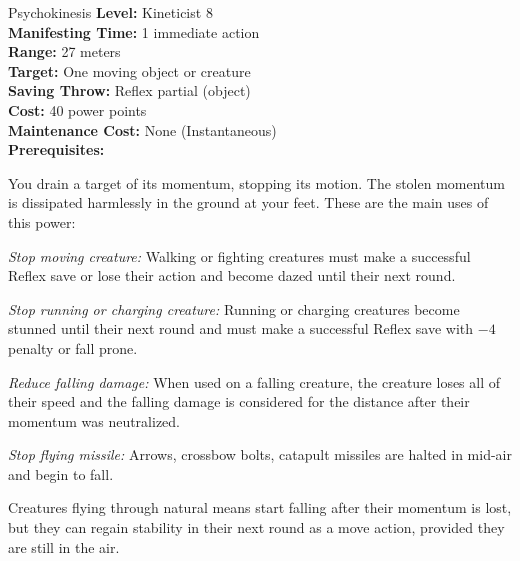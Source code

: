 {Psychokinesis}
{
	\textbf{Level:}
	Kineticist 8\\
	\textbf{Manifesting Time:}
	1 immediate action\\
	\textbf{Range:}
	27 meters\\
	\textbf{Target:}
	One moving object or creature\\
	\textbf{Saving Throw:}
	Reflex partial (object)\\
	\textbf{Cost:}
	40 power points\\
	\textbf{Maintenance Cost:}
	None (Instantaneous)\\
	\textbf{Prerequisites:}
	\\
}
{
	You drain a target of its momentum, stopping its motion. The stolen momentum is dissipated harmlessly in the ground at your feet. These are the main uses of this power:
	\begin{enumerate*}
		\item \textit{Stop moving creature:} Walking or fighting creatures must make a successful Reflex save or lose their action and become dazed until their next round.

		\item \textit{Stop running or charging creature:} Running or charging creatures become stunned until their next round and must make a successful Reflex save with $-4$ penalty or fall prone.

		\item \textit{Reduce falling damage:} When used on a falling creature, the creature loses all of their speed and the falling damage is considered for the distance after their momentum was neutralized.

		\item \textit{Stop flying missile:} Arrows, crossbow bolts, catapult missiles are halted in mid-air and begin to fall.
	\end{enumerate*}

	Creatures flying through natural means start falling after their momentum is lost, but they can regain stability in their next round as a move action, provided they are still in the air.
}